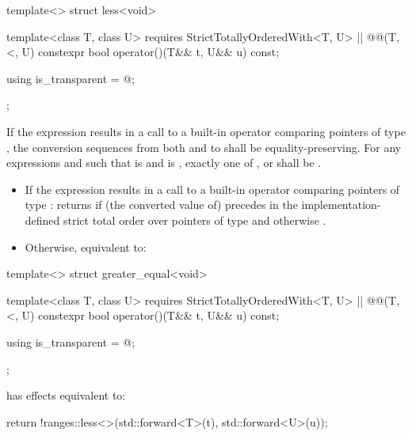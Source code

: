 {%
\begin{itemdecl}
template<> struct less<void> {
  template<class T, class U>
    requires StrictTotallyOrderedWith<T, U> || @\textit{}@(T, <, U)
  constexpr bool operator()(T&& t, U&& u) const;

  using is_transparent = @\unspecnc@;
};
\end{itemdecl}

\begin{itemdescr}
\pnum
\requires
If the expression  results in a
call to a built-in operator \tcode{<} comparing pointers of type , the
conversion sequences from both  and  to  shall be
equality-preserving. For any expressions
 and  such that  is  and
 is , exactly one of ,
 or  shall be
.

\pnum
\effects
\begin{itemize}
\item
If the expression  results in a
call to a built-in operator \tcode{<} comparing pointers of type :
returns  if (the converted value of)  precedes  in
the implementation-defined strict total order over pointers of type 
and otherwise .

\item
Otherwise, equivalent to: 
\end{itemize}
\end{itemdescr}

%
\begin{itemdecl}
template<> struct greater_equal<void> {
  template<class T, class U>
    requires StrictTotallyOrderedWith<T, U> || @\textit{}@(T, <, U)
  constexpr bool operator()(T&& t, U&& u) const;

  using is_transparent = @\unspecnc@;
};
\end{itemdecl}

\begin{itemdescr}
\pnum
{} has effects equivalent to:
\begin{codeblock}
return !ranges::less<>{}(std::forward<T>(t), std::forward<U>(u));
\end{codeblock}
\end{itemdescr}

}
